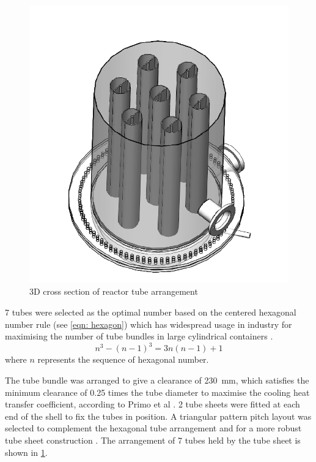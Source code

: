 \begin{figure}
    \centering
    \includegraphics[width=\linewidth]{chapters/2-reaction/figures/FYD reactor 7 tubes cross section 3D.PNG}
    \caption{3D cross section of reactor tube arrangement}
    \label{fig:reactortubearrangement}
\end{figure}
7 tubes were selected as the optimal number based on the centered hexagonal number rule (see \cref{eqn: hexagon}) which has widespread usage in industry for maximising the number of tube bundles in large cylindrical containers \cite{noauthor_realiable_2018}. 
\begin{equation}
    n^3 - (n-1)^3 = 3n(n-1)+1
    \label{eqn: hexagon}
\end{equation}
where $n$ represents the sequence of hexagonal number. 

The tube bundle was arranged to give a clearance of \SI{230}{\milli \metre}, which satisfies the minimum clearance of 0.25 times the tube diameter to maximise the cooling heat transfer coefficient, according to Primo et al \cite{primo_shell_2012} . 2 tube sheets were fitted at each end of the shell to fix the tubes in position. A triangular pattern pitch layout was selected to complement the hexagonal tube arrangement and for a more robust tube sheet construction \cite{primo_shell_2012}. The arrangement of 7 tubes held by the tube sheet is shown in \cref{fig:reactortubearrangement}.

